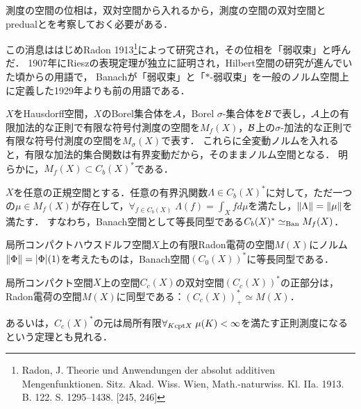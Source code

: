 \documentclass[uplatex,dvipdfmx]{jsreport}
\begin{document}
\begin{tcolorbox}[colframe=ForestGreen, colback=ForestGreen!10!white,breakable,colbacktitle=ForestGreen!40!white,coltitle=black,fonttitle=\bfseries\sffamily,
title=測度の双対空間と前双対空間]
    測度の空間の位相は，双対空間から入れるから，測度の空間の双対空間とpredualとを考察しておく必要がある．

    この消息ははじめRadon 1913\footnote{Radon, J. Theorie und Anwendungen der absolut additiven Mengenfunktionen. Sitz. Akad.
    Wiss. Wien, Math.-naturwiss. Kl. IIa. 1913. B. 122. S. 1295–1438. [245, 246]}によって研究され，その位相を「弱収束」と呼んだ．
    1907年にRieszの表現定理が独立に証明され，Hilbert空間の研究が進んでいた頃からの用語で，
    Banachが「弱収束」と「$*$-弱収束」を一般のノルム空間上に定義した1929年よりも前の用語である．
\end{tcolorbox}

\begin{notation}
    $X$をHausdorff空間，$X$のBorel集合体を$\mathcal{A}$，Borel $\sigma$-集合体を$\mathcal{B}$で表し，$\mathcal{A}$上の有限加法的な正則で有限な符号付測度の空間を$M_f(X)$，$\mathcal{B}$上の$\sigma$-加法的な正則で有限な符号付測度の空間を$M_\sigma(X)$で表す．
    これらに全変動ノルムを入れると，有限な加法的集合関数は有界変動だから，そのままノルム空間となる．
    明らかに，$M_f(X)\subset C_b(X)^*$である．
\end{notation}

\begin{proposition}[Alexandrov (1940)]\label{prop-representation-theorem-C_b}
    $X$を任意の正規空間とする．任意の有界汎関数$\Lambda\in C_b(X)^*$に対して，ただ一つの$\mu\in M_f(X)$が存在して，$\forall_{f\in C_b(X)}\;\Lambda(f)=\int_Xfd\mu$を満たし，$\|\Lambda\|=\|\mu\|$を満たす．
    すなわち，Banach空間として等長同型である$C_b(X)^*\simeq_{\mathrm{Ban}} M_f(X)$．
\end{proposition}

\begin{proposition}\label{prop-representation-theorem-C_0}
    局所コンパクトハウスドルフ空間$X$上の有限Radon電荷の空間$M(X)$にノルム$\|\Phi\|=\lvert\Phi\rvert(1)$を考えたものは，Banach空間$(C_0(X))^*$に等長同型である．
\end{proposition}

\begin{proposition}\label{prop-representation-theorem-C_c}
    局所コンパクト空間$X$上の空間$C_c(X)$の双対空間$(C_c(X))^*$の正部分は，Radon電荷の空間$M(X)$に同型である：$(C_c(X))^*_+\simeq M(X)$．
\end{proposition}
\begin{remark}
    あるいは，$C_c(X)^*$の元は局所有限$\forall_{K\mathrm{cpt} X}\;\mu(K)<\infty$を満たす正則測度になるという定理とも見れる．
\end{remark}
\end{document}
